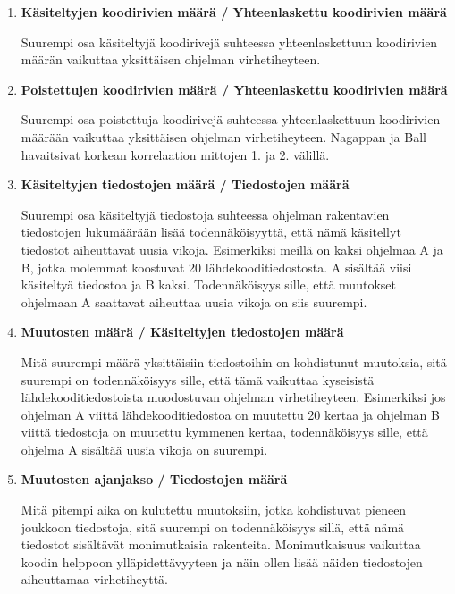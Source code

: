 \documentclass[finnish]{../tktltiki2}
\theoremstyle{definition}
\theoremstyle{remark}
\begin{document}
\begin{enumerate}
    
    \item {\bf Käsiteltyjen koodirivien määrä / Yhteenlaskettu koodirivien määrä}
    
    Suurempi osa käsiteltyjä koodirivejä suhteessa yhteenlaskettuun koodirivien määrän vaikuttaa yksittäisen ohjelman 
    virhetiheyteen.
    
    \item {\bf Poistettujen koodirivien määrä / Yhteenlaskettu koodirivien määrä}
    
    Suurempi osa poistettuja koodirivejä suhteessa yhteenlaskettuun koodirivien määrään vaikuttaa yksittäisen ohjelman 
    virhetiheyteen. Nagappan ja Ball havaitsivat korkean korrelaation mittojen 1. ja 2. välillä.
    
    \item {\bf Käsiteltyjen tiedostojen määrä / Tiedostojen määrä}
    
    Suurempi osa käsiteltyjä tiedostoja suhteessa ohjelman rakentavien tiedostojen lukumäärään lisää todennäköisyyttä, 
    että nämä käsitellyt tiedostot aiheuttavat uusia vikoja. Esimerkiksi meillä on kaksi ohjelmaa A ja B, jotka molemmat 
    koostuvat 20 lähdekooditiedostosta. A sisältää viisi käsiteltyä tiedostoa ja B kaksi. Todennäköisyys sille, että 
    muutokset ohjelmaan A saattavat aiheuttaa uusia vikoja on siis suurempi.
    
    \item {\bf Muutosten määrä / Käsiteltyjen tiedostojen määrä}
    
    Mitä suurempi määrä yksittäisiin tiedostoihin on kohdistunut muutoksia, sitä suurempi on todennäköisyys sille, että 
    tämä vaikuttaa kyseisistä lähdekooditiedostoista muodostuvan ohjelman virhetiheyteen. Esimerkiksi jos ohjelman A 
    viittä lähdekooditiedostoa on muutettu 20 kertaa ja ohjelman B viittä tiedostoja on muutettu kymmenen kertaa, 
    todennäköisyys sille, että ohjelma A sisältää uusia vikoja on suurempi.

    \item {\bf Muutosten ajanjakso / Tiedostojen määrä}
    
    Mitä pitempi aika on kulutettu muutoksiin, jotka kohdistuvat pieneen joukkoon tiedostoja, sitä suurempi on 
    todennäköisyys sillä, että nämä tiedostot sisältävät monimutkaisia rakenteita. Monimutkaisuus vaikuttaa koodin 
    helppoon ylläpidettävyyteen ja näin ollen lisää näiden tiedostojen aiheuttamaa virhetiheyttä.


\end{enumerate}
\end{document}
